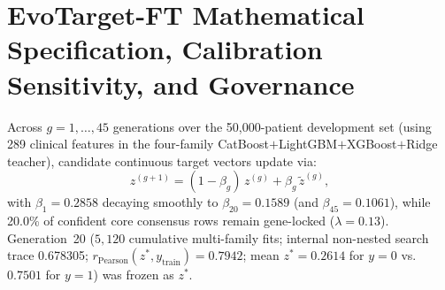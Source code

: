 \section{EvoTarget-FT Mathematical Specification, Calibration Sensitivity, and Governance}
\label{app:evotarget_math}

Across $g = 1,\dots,45$ generations over the 50,000-patient development set (using 289 clinical features in the four-family CatBoost$+$LightGBM$+$XGBoost$+$Ridge teacher), candidate continuous target vectors update via:
\begin{equation}
  z^{(g+1)} = (1 - \beta_g)\, z^{(g)} + \beta_g\, \tilde{z}^{(g)},
  \label{eq:ewma}
\end{equation}
with $\beta_1 = 0.2858$ decaying smoothly to $\beta_{20} = 0.1589$ (and $\beta_{45} = 0.1061$), while 20.0\% of confident core consensus rows remain gene-locked ($\lambda = 0.13$). Generation~20 ($5{,}120$ cumulative multi-family fits; internal non-nested search trace 0.678305; $r_{\mathrm{Pearson}}(z^*, y_{\mathrm{train}}) = 0.7942$; mean $z^* = 0.2614$ for $y=0$ vs.\ $0.7501$ for $y=1$) was frozen as $z^*$.

